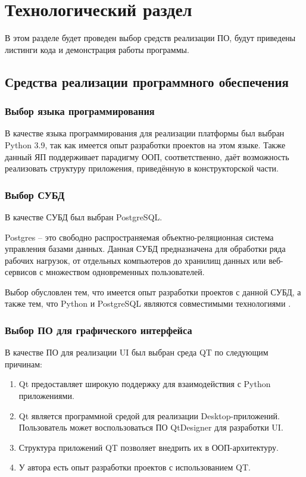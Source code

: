 \section{Технологический раздел}
В этом разделе будет проведен выбор средств реализации ПО, будут приведены листинги кода и демонстрация работы программы.

\subsection{Средства реализации программного обеспечения}
\subsubsection{Выбор языка программирования}
В качестве языка программирования для реализации платформы был выбран Python 3.9, так как имеется опыт разработки проектов на этом языке. 
Также данный ЯП поддерживает парадигму ООП, соответственно, даёт возможность реализовать структуру приложения, приведённую в конструкторской части.

\subsubsection{Выбор СУБД}
В качестве СУБД был выбран PostgreSQL.

Postgres \cite{postgresql} -- это свободно распространяемая объектно-реляционная система управления базами данных.
Данная СУБД предназначена для обработки ряда рабочих нагрузок, от отдельных компьютеров до хранилищ данных или веб-сервисов с множеством одновременных пользователей. 

Выбор обусловлен тем, что имеется опыт разработки проектов с данной СУБД, а также тем, что Python и PostgreSQL являются совместимыми технологиями  \cite{psycopg2}.

\subsubsection{Выбор ПО для графического интерфейса}
В качестве ПО для реализации UI был выбран среда QT по следующим причинам:
\begin{enumerate}
	\item Qt предоставляет широкую поддержку для взаимодействия с Python приложениями.
	\item Qt является программной средой для реализации Desktop-приложений. Пользователь может воспользоваться ПО QtDesigner для разработки UI.
	\item Структура приложений QT позволяет внедрить их в ООП-архитектуру.
	\item У автора есть опыт разработки проектов с использованием QT.
\end{enumerate} 

